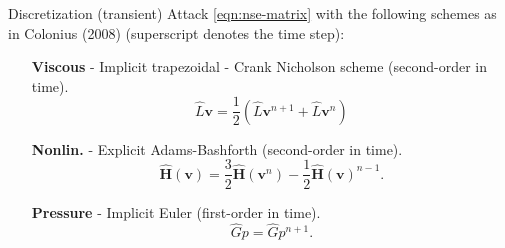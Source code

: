 \documentclass{beamer}
\begin{document}
	
	\begin{frame}{Discretization (transient)}
	Attack \eqref{eqn:nse-matrix} with the following schemes as in Colonius (2008) (superscript denotes the time step):
\begin{enumerate}
	\item[\textbf{Viscous}] - Implicit trapezoidal - Crank Nicholson scheme (second-order in time).  
	\begin{equation}\label{eqn:viscous-crank-nicholson}
  		\hat{L}\boldsymbol{v}=\frac{1}{2}\left(\hat{L}\boldsymbol{v}^{n+1}+\hat{L}\boldsymbol{v}^n\right)
	\end{equation}

	\item[\textbf{Nonlin.}] - Explicit Adams-Bashforth (second-order in time).
	\begin{equation}\label{eqn:nonlinear-adams-bashforth}
		\mathbf{\hat{H}}(\boldsymbol{v}) = \frac{3}{2}\mathbf{\hat{H}}(\boldsymbol{v}^{n}) - \frac{1}{2}\mathbf{\hat{H}}(\boldsymbol{v})^{n-1}.
	\end{equation}

	\item[\textbf{Pressure}] - Implicit Euler (first-order in time). 
	\begin{equation}\label{eqn:pressure-implicit-euler} 
		\hat{G}p = \hat{G}p^{n+1}.
	\end{equation}
	\end{enumerate}
	\end{frame}
	
\end{document}
